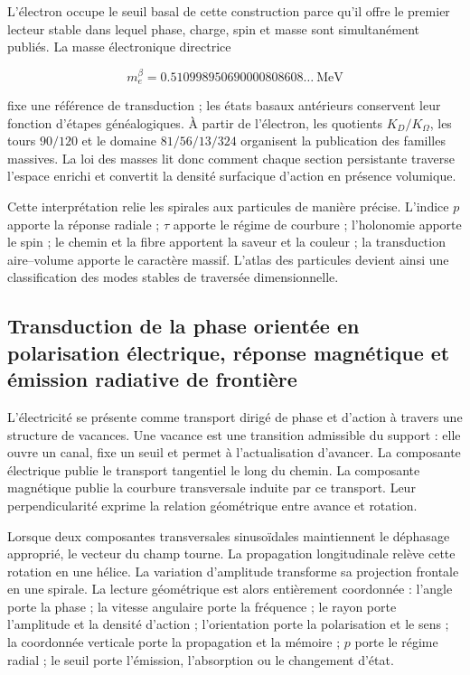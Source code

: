 L'électron occupe le seuil basal de cette construction parce qu'il offre le premier lecteur stable dans lequel phase, charge, spin et masse sont simultanément publiés. La masse électronique directrice

\[
m_e^\beta=0.510998950690000808608\ldots\ \mathrm{MeV}
\]

fixe une référence de transduction ; les états basaux antérieurs conservent leur fonction d'étapes généalogiques. À partir de l'électron, les quotients \(K_D/K_\Omega\), les tours \(90/120\) et le domaine \(81/56/13/324\) organisent la publication des familles massives. La loi des masses lit donc comment chaque section persistante traverse l'espace enrichi et convertit la densité surfacique d'action en présence volumique.

Cette interprétation relie les spirales aux particules de manière précise. L'indice \(p\) apporte la réponse radiale ; \(\tau\) apporte le régime de courbure ; l'holonomie apporte le spin ; le chemin et la fibre apportent la saveur et la couleur ; la transduction aire–volume apporte le caractère massif. L'atlas des particules devient ainsi une classification des modes stables de traversée dimensionnelle.

\subsection{Transduction de la phase orientée en polarisation électrique, réponse magnétique et émission radiative de frontière}

L'électricité se présente comme transport dirigé de phase et d'action à travers une structure de vacances. Une vacance est une transition admissible du support : elle ouvre un canal, fixe un seuil et permet à l'actualisation d'avancer. La composante électrique publie le transport tangentiel le long du chemin. La composante magnétique publie la courbure transversale induite par ce transport. Leur perpendicularité exprime la relation géométrique entre avance et rotation.

Lorsque deux composantes transversales sinusoïdales maintiennent le déphasage approprié, le vecteur du champ tourne. La propagation longitudinale relève cette rotation en une hélice. La variation d'amplitude transforme sa projection frontale en une spirale. La lecture géométrique est alors entièrement coordonnée : l'angle porte la phase ; la vitesse angulaire porte la fréquence ; le rayon porte l'amplitude et la densité d'action ; l'orientation porte la polarisation et le sens ; la coordonnée verticale porte la propagation et la mémoire ; \(p\) porte le régime radial ; le seuil porte l'émission, l'absorption ou le changement d'état.

